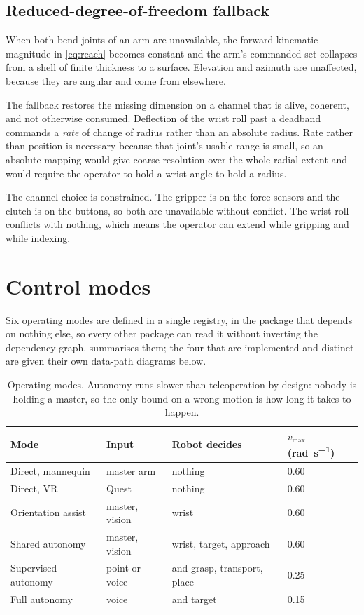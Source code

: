 \subsection{Reduced-degree-of-freedom fallback}

When both bend joints of an arm are unavailable, the forward-kinematic
magnitude in \cref{eq:reach} becomes constant and the arm's commanded set
collapses from a shell of finite thickness to a surface. Elevation and azimuth
are unaffected, because they are angular and come from elsewhere.

The fallback restores the missing dimension on a channel that is alive,
coherent, and not otherwise consumed. Deflection of the wrist roll past a
deadband commands a \emph{rate} of change of radius rather than an absolute
radius. Rate rather than position is necessary because that joint's usable
range is small, so an absolute mapping would give coarse resolution over the
whole radial extent and would require the operator to hold a wrist angle to
hold a radius.

The channel choice is constrained. The gripper is on the force sensors and the
clutch is on the buttons, so both are unavailable without conflict. The wrist
roll conflicts with nothing, which means the operator can extend while
gripping and while indexing.

\section{Control modes}

Six operating modes are defined in a single registry, in the package that
depends on nothing else, so every other package can read it without inverting
the dependency graph.  summarises them; the four that are
implemented and distinct are given their own data-path diagrams below.

\begin{table}[htbp]
  \centering
  \caption{Operating modes. Autonomy runs slower than teleoperation by design:
  nobody is holding a master, so the only bound on a wrong motion is how long
  it takes to happen.}
  \label{tab:modes}
  \begin{tabular}{@{}llll@{}}
    \toprule
    Mode & Input & Robot decides & $v_{\max}$ (\si{\radian\per\second}) \\
    \midrule
    Direct, mannequin      & master arm      & nothing & 0.60 \\
    Direct, VR             & Quest           & nothing & 0.60 \\
    Orientation assist     & master, vision  & wrist   & 0.60 \\
    Shared autonomy        & master, vision  & wrist, target, approach & 0.60 \\
    Supervised autonomy    & point or voice  & and grasp, transport, place & 0.25 \\
    Full autonomy          & voice           & and target & 0.15 \\
    \bottomrule
  \end{tabular}
\end{table}

